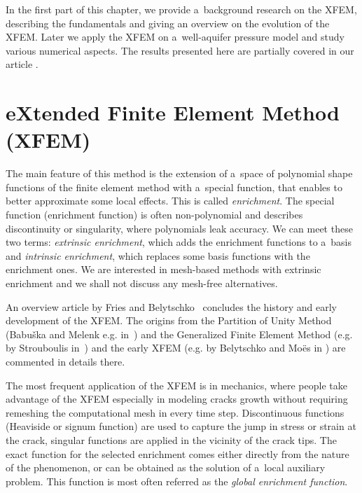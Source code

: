 

In the first part of this chapter, we provide a~background research on the XFEM,
describing the fundamentals and giving an overview on the evolution of the XFEM.
Later we apply the XFEM on a~well-aquifer pressure model and study various numerical aspects.
The results presented here are partially covered in our article \cite{exner_2016}.

\section{eXtended Finite Element Method (XFEM)} \label{sec:soa_xfem}

The main feature of this method is the extension of a~space of polynomial shape functions of the finite element
method with a~special function, that enables to better approximate some local effects. This is called \emph{enrichment}.
The special function (enrichment function) is often non-polynomial and describes discontinuity or singularity,
where polynomials leak accuracy. We can meet these two terms: \emph{extrinsic enrichment}, which adds the enrichment
functions to a~basis and \emph{intrinsic enrichment}, which replaces some basis functions with the enrichment ones.
We are interested in mesh-based methods with extrinsic enrichment and we shall not discuss any mesh-free alternatives.

An overview article by Fries and Belytschko~\cite{fries_xfem_overview_2010} concludes the history and early development
of the XFEM. The origins from the Partition of Unity Method (Babu{\v s}ka and Melenk e.g. in~\cite{babuska_partition_1997}) and
the Generalized Finite Element Method (e.g. by Strouboulis in~\cite{strouboulis_generalized_2000}) 
and the early XFEM (e.g. by Belytschko and Mo{\"e}s in \cite{moes_finite_1999}) are commented in details there.

The most frequent application of the XFEM is in mechanics, where people take advantage of the XFEM especially in
modeling cracks growth without requiring remeshing the computational mesh in every time step. 
Discontinuous functions (Heaviside or signum function) are used to capture the jump in stress or strain at the crack,
singular functions are applied in the vicinity of the crack tips. The exact function for the selected enrichment
comes either directly from the nature of the phenomenon, or can be obtained as the solution of a~local auxiliary
problem. This function is most often referred as the \emph{global enrichment function}.

